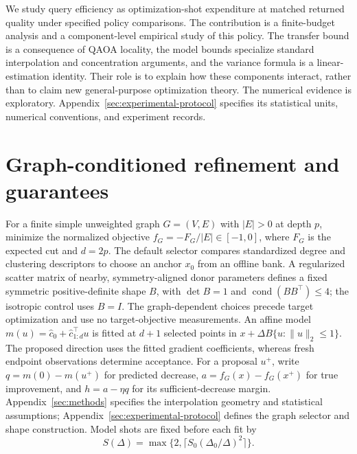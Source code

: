 \documentclass[11pt]{article}
\begin{document}
We study query efficiency as optimization-shot expenditure at matched
returned quality under specified policy comparisons. The contribution is a
finite-budget analysis and a component-level empirical study of this policy. The transfer bound is a consequence of QAOA
locality, the model bounds specialize standard interpolation and concentration
arguments, and the variance formula is a linear-estimation identity. Their
role is to explain how these components interact, rather than to claim new
general-purpose optimization theory. The numerical evidence is exploratory. Appendix~\ref{sec:experimental-protocol}
specifies its statistical units, numerical conventions, and experiment records.


\section{Graph-conditioned refinement and guarantees}
\label{sec:algorithm}
For a finite simple unweighted graph $G=(V,E)$ with $|E|>0$ at depth $p$,
minimize the normalized objective
$f_G=-F_G/|E|\in[-1,0]$, where $F_G$ is the expected cut and $d=2p$.
The default selector compares standardized degree and clustering descriptors
to choose an anchor $x_0$ from an offline bank. A regularized scatter matrix
of nearby, symmetry-aligned donor parameters defines a fixed symmetric
positive-definite shape $B$, with $\det B=1$ and
$\operatorname{cond}(BB^\top)\le4$; the isotropic control uses $B=I$.
The graph-dependent choices precede target optimization and use no
target-objective measurements.
An affine model $m(u)=\widehat c_0+\widehat c_{1:d}^{\top}u$ is fitted
at $d+1$ selected points in $x+\Delta B\{u:\|u\|_2\le1\}$.
The proposed direction uses the fitted gradient coefficients, whereas
fresh endpoint observations determine acceptance. For a proposal $u^+$,
write $q=m(0)-m(u^+)$ for predicted decrease, $a=f_G(x)-f_G(x^+)$
for true improvement, and $h=a-\eta q$ for its sufficient-decrease margin.
Appendix~\ref{sec:methods} specifies the interpolation geometry and
statistical assumptions; Appendix~\ref{sec:experimental-protocol} defines
the graph selector and shape construction. Model shots are fixed before each fit by
\begin{equation}
 S(\Delta)=\max\{2,\lceil S_0(\Delta_0/\Delta)^2\rceil\}.
 \label{eq:radiusshots}
\end{equation}

\end{document}
